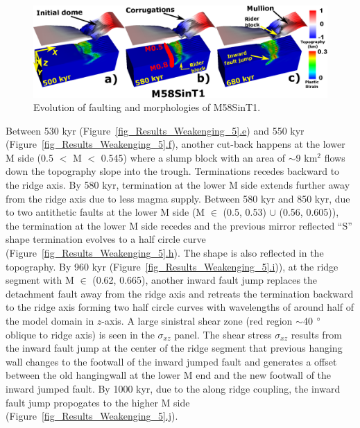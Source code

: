 \begin{figure}[h]
 \centering
  \includegraphics[width=1.0\textwidth]{./Figures/fig_Results_3_4_2_M58SinT1_mullion_riderBlock_inwardFaultJump.eps}
 \caption{Evolution of faulting and morphologies of M58SinT1.}
\label{fig_Results_3_4_2_M58SinT1_mullion_riderBlock_inwardFaultJump}
\end{figure}

Between 530 kyr (Figure~\hyperref[fig_Results_Weakenging_5]{\ref{fig_Results_Weakenging_5}.e}) and 550 kyr (Figure~\hyperref[fig_Results_Weakenging_5]{\ref{fig_Results_Weakenging_5}.f}), another cut-back happens at the lower M side (0.5 $<$ M $<$ 0.545) where a slump block with an area of $\sim$9 km$^{2}$ flows down the topography slope into the trough. Terminations recedes backward to the ridge axis. By 580 kyr, termination at the lower M side extends further away from the ridge axis due to less magma supply. Between 580 kyr and 850 kyr, due to two antithetic faults at the lower M side (M $\in$ (0.5, 0.53) $\cup$ (0.56, 0.605)), the termination at the lower M side recedes and the previous mirror reflected ``S'' shape termination evolves to a half circle curve (Figure~\hyperref[fig_Results_Weakenging_5]{\ref{fig_Results_Weakenging_5}.h}). The shape is also reflected in the topography. By 960 kyr (Figure~\hyperref[fig_Results_Weakenging_5]{\ref{fig_Results_Weakenging_5}.i})), at the ridge segment with M $\in$ (0.62, 0.665), another inward fault jump replaces the detachment fault away from the ridge axis and retreats the termination backward to the ridge axis forming two half circle curves with wavelengths of around half of the model domain in $z$-axis. A large sinistral shear zone (red region $\sim$40 $\degree$ oblique to ridge axis) is seen in the $\sigma_{xz}$ panel. The shear stress $\sigma_{xz}$ results from the inward fault jump at the center of the ridge segment that previous hanging wall changes to the footwall of the inward jumped fault and generates a offset between the old hangingwall at the lower M end and the new footwall of the inward jumped fault. By 1000 kyr, due to the along ridge coupling, the inward fault jump propogates to the higher M side (Figure~\hyperref[fig_Results_Weakenging_5]{\ref{fig_Results_Weakenging_5}.j}). 


